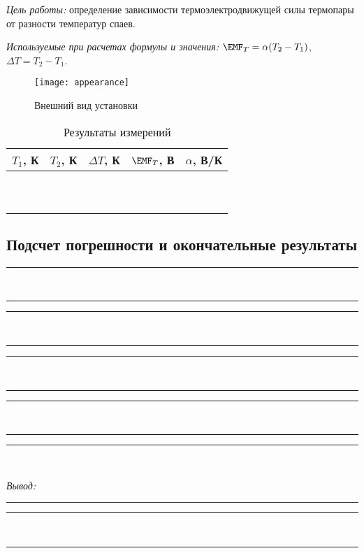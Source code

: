 \documentclass[10pt, pscyr, nonums]{hedlabwork}
\begin{document}
  \makeheader

  \emph{Цель работы:} определение зависимости термоэлектродвижущей силы
  термопары от разности температур спаев.

  \emph{Используемые при расчетах формулы и значения:}
  \( \EMF_T = \alpha (T_2 - T_1) \), \( \Delta T = T_2 - T_1 \).

  \begin{figure}[h!]
    \center
    \texttt{[image: appearance]} \\
    \parbox{.5\textwidth}{\caption{Внешний вид установки}}
  \end{figure}
  \vspace*{-2em}

  \begin{table}[h!]
    \center \caption{Результаты измерений}
    \begin{tabular}{|*{5}{C{.12}|}} \hline
      \( T_1 \), К & \( T_2 \), К & \( \Delta T \), К &
        \( \EMF_T \), В & \( \alpha \), В/К \\ \hline
       &&&&  \\ 
      &&&& \\ 
      &&&& \\ 
      &&&& \\ 
      &&&& \\ 
      &&&& \\ 
      &&&& \\ 
      &&&& \\ 
      &&&& \\ 
      &&&& \\ \hline
    \end{tabular}
  \end{table}

  \subsection{Подсчет погрешности и окончательные результаты}
  \center
  \rule{.95\textwidth}{.5pt} \\ \rule{.95\textwidth}{.5pt}
  \rule{.95\textwidth}{.5pt} \\ \rule{.95\textwidth}{.5pt}
  \rule{.95\textwidth}{.5pt} \\ \rule{.95\textwidth}{.5pt}
  \rule{.95\textwidth}{.5pt} \\ \rule{.95\textwidth}{.5pt}
  \rule{.95\textwidth}{.5pt} \\ \vspace*{2em}

  \emph{Вывод:} \rule{.885\textwidth}{.5pt}
  \rule{.95\textwidth}{.5pt} \\ \rule{.95\textwidth}{.5pt}
\end{document}
